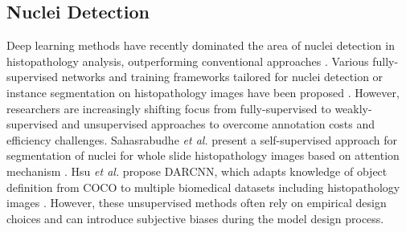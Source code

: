 \documentclass[journal,twoside,web]{ieeecolor}
\begin{document}
\subsection{Nuclei Detection} Deep learning methods have recently dominated the area of nuclei detection in histopathology analysis, outperforming conventional approaches \cite{gleason1992histologic, irshad2013methods, mouelhi2018fast}. Various fully-supervised networks and training frameworks tailored for nuclei detection or instance segmentation on histopathology images have been proposed \cite{mahanta2021ihc,graham2019hover,yi2019multi}. However, researchers are increasingly shifting focus from fully-supervised to weakly-supervised \cite{li2019signet, qu2020weakly} and unsupervised approaches \cite{sahasrabudhe2020self, le2022unsupervised} to overcome annotation costs and efficiency challenges. Sahasrabudhe \textit{et al.} present a self-supervised approach for segmentation of nuclei for whole slide histopathology images based on attention mechanism \cite{sahasrabudhe2020self}. Hsu \textit{et al.} propose DARCNN, which adapts knowledge of object definition from COCO \cite{lin2014microsoft} to multiple biomedical datasets including histopathology images \cite{hsu2021darcnn}. However, these unsupervised methods often rely on empirical design choices and can introduce subjective biases during the model design process. 

\end{document}
